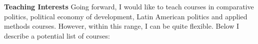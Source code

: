 \documentclass[11pt]{letter} %
\begin{document}
\begin{letter}{}
{\bf Teaching Interests} Going forward, I would like to teach courses in comparative politics, political economy of development, Latin American politics and applied methods courses. However, within this range, I can be quite flexible. Below I describe a potential list of courses:







\end{letter}
\end{document}
